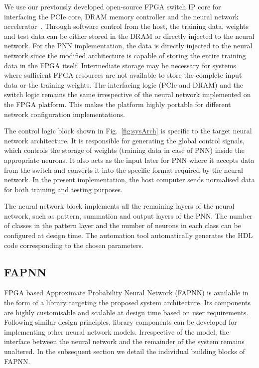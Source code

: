 We use our previously developed open-source FPGA switch IP core for interfacing the PCIe core, DRAM memory controller and the neural network accelerator~\cite{blanked}.
Through software control from the host, the training data, weights and test data can be either stored in the DRAM or directly injected to the neural network.
For the PNN implementation, the data is directly injected to the neural network since the modified architecture is capable of storing the entire training data in the FPGA itself.
Intermediate storage may be necessary for systems where sufficient FPGA resources are not available to store the complete input data or the training weights.
The interfacing logic (PCIe and DRAM) and the switch logic remains the same irrespective of the neural network implemented on the FPGA platform.
This makes the platform highly portable for different network configuration implementations.

The control logic block shown in Fig.~\ref{fig:sysArch} is specific to the target neural network architecture.
It is responsible for generating the global control signals, which controls the storage of weights (training data in case of PNN) inside the appropriate neurons.
It also acts as the input later for PNN where it accepts data from the switch and converts it into the specific format required by the neural network.
In the present implementation, the host computer sends normalised data for both training and testing purposes.

The neural network block implements all the remaining layers of the neural network, such as pattern, summation and output layers of the PNN.
The number of classes in the pattern layer and the number of neurons in each class can be configured at design time.
The automation tool automatically generates the HDL code corresponding to the chosen parameters.

\subsection{FAPNN}
FPGA based Approximate Probability Neural Network (FAPNN) is available in the form of a library targeting the proposed system architecture.
Its components are highly customisable and scalable at design time based on user requirements.
Following similar design principles, library components can be developed for implementing other neural network models.
Irrespective of the model, the interface between the neural network and the remainder of the system remains unaltered.
In the subsequent section we detail the individual building blocks of FAPNN.

